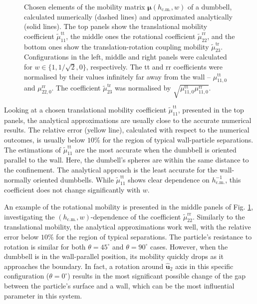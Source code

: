\documentclass{master_thesis}
\begin{document}
\begin{figure}
    \centering
    
    \caption{Chosen elements of the mobility matrix $\bm{\mu}(h_{\textrm{c.m.}}, w)$ of a dumbbell, calculated numerically (dashed lines) and approximated analytically (solid lines). The top panels show the translational mobility coefficient $\tilde{\mu}^{\textrm{tt}}_{11}$, the middle ones the rotational coefficient $\tilde{\mu}^{\textrm{rr}}_{22}$, and the bottom ones show the translation-rotation coupling mobility $\tilde{\mu}^{\textrm{tr}}_{23}$. Configurations in the left, middle and right panels were calculated for $w \in \{1, 1/\sqrt{2}, 0 \}$, respectively. The tt and rr coefficients were normalised by their values infinitely far away from the wall -- $\mu^{\textrm{tt}}_{11,0}$ and $\mu^{\textrm{rr}}_{22,0}$. The coefficient $\tilde{\mu}^{\textrm{tr}}_{23}$ was normalised by $\sqrt{\mu^{\textrm{tt}}_{11,0}\mu^{\textrm{rr}}_{11,0}}$.}
    \label{fig:dumbbell_dimensionless_mobilities_comparison}
\end{figure}

Looking at a chosen translational mobility coefficient $\tilde{\mu}_{11}^{\textrm{tt}}$, presented in the top panels, the analytical approximations are usually close to the accurate numerical results. The relative error (yellow line), calculated with respect to the numerical outcomes, is usually below $10\%$ for the region of typical wall-particle separations. The estimations of $\tilde{\mu}_{11}^{\textrm{tt}}$ are the most accurate when the dumbbell is oriented parallel to the wall. Here, the dumbell's spheres are within the same distance to the confinement. The analytical approach is the least accurate for the wall-normally oriented dumbbells. While $\tilde{\mu}_{11}^{\textrm{tt}}$ shows clear dependence on $h_{\textrm{c.m.}}^{-1}$, this coefficient does not change significantly with $w$.

An example of the rotational mobility is presented in the middle panels of Fig. \ref{fig:dumbbell_dimensionless_mobilities_comparison}, investigating the $(h_{\textrm{c.m.}}, w)$-dependence of the coefficient $\tilde{\mu}^{\textrm{rr}}_{22}$. Similarly to the translational mobility, the analytical approximations work well, with the relative error below $10\%$ for the region of typical separations. The particle's resistance to rotation is similar for both $\theta=45^{\circ}$ and $\theta=90^{\circ}$ cases. However, when the dumbbell is in the wall-parallel position, its mobility quickly drops as it approaches the boundary. In fact, a rotation around $\hat{\boldsymbol{u}}_2$ axis in this specific configuration ($\theta = 0^{\circ}$) results in the most significant possible change of the gap between the particle's surface and a wall, which can be the most influential parameter in this system.
\end{document}
